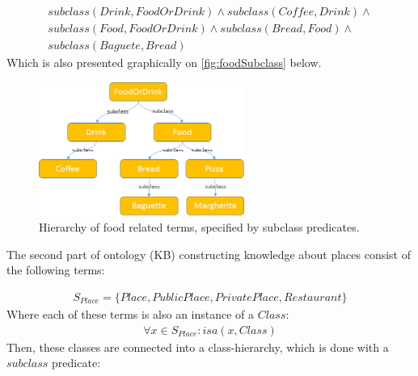 \begin{equation}\label{as:kbFoodSubclasses}
\begin{gathered}
    subclass(Drink,FoodOrDrink) \land subclass(Coffee,Drink) \land \\
	subclass(Food,FoodOrDrink) \land subclass(Bread,Food) \land \\
	subclass(Baguete, Bread)
\end{gathered}
\end{equation}
Which is also presented graphically on \autoref{fig:foodSubclass} below.
\begin{figure}[H]
	\centering
		\includegraphics[width=0.6\textwidth]{figures/foodOntology.png}
	\caption{Hierarchy of food related terms, specified by subclass predicates.}
	\label{fig:foodSubclass}
\end{figure}

The second part of ontology (KB) constructing knowledge about places consist
of the following terms:

\begin{equation}\label{set:placeTerms}
\begin{gathered}
S_{Place} = \{Place,PublicPlace,PrivatePlace,Restaurant\}
\end{gathered}
\end{equation}
Where each of these terms is also an instance of a $Class$:
\begin{equation}\label{set:placeTermsClass}
\begin{gathered}
\forall x \in S_{Place}: isa(x,Class)
\end{gathered}
\end{equation}
Then, these classes are connected into a class-hierarchy, which is done with
a $subclass$ predicate:

